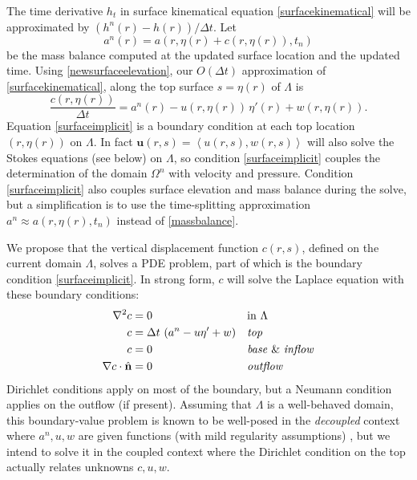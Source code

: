 \documentclass[letterpaper,final,12pt,reqno]{amsart}
\newcommand{\grad}{\nabla}
\newcommand{\hbn}{\hat{\mathbf{n}}}
\newcommand{\bu}{\mathbf{u}}
\begin{document}
The time derivative $h_t$ in surface kinematical equation \eqref{surfacekinematical} will be approximated by $(h^n(r) - h(r))/\Delta t$.  Let
\begin{equation}
a^n(r) = a\left(r,\eta(r) + c(r,\eta(r)),t_n\right) \label{massbalance}
\end{equation}
be the mass balance computed at the updated surface location and the updated time.  Using \eqref{newsurfaceelevation}, our $O(\Delta t)$ approximation of \eqref{surfacekinematical}, along the top surface $s=\eta(r)$ of $\Lambda$ is
\begin{equation}
\frac{c(r,\eta(r))}{\Delta t} = a^n(r) - u(r,\eta(r))\,\eta'(r) + w(r,\eta(r)). \label{surfaceimplicit}
\end{equation}
Equation \eqref{surfaceimplicit} is a boundary condition at each top location $(r,\eta(r))$ on $\Lambda$.  In fact $\bu(r,s)=\left<u(r,s),w(r,s)\right>$ will also solve the Stokes equations (see below) on $\Lambda$, so condition \eqref{surfaceimplicit} couples the determination of the domain $\Omega^n$ with velocity and pressure.  Condition \eqref{surfaceimplicit} also couples surface elevation and mass balance during the solve, but a simplification is to use the time-splitting approximation $a^n \approx a(r,\eta(r),t_n)$ instead of \eqref{massbalance}.

We propose that the vertical displacement function $c(r,s)$, defined on the current domain $\Lambda$, solves a PDE problem, part of which is the boundary condition \eqref{surfaceimplicit}.  In strong form, $c$ will solve the Laplace equation with these boundary conditions:
\begin{align}
        \grad^2 c &= 0 &&\text{in } \Lambda \label{claplace} \\
                c &= \Delta t\,\left(a^n - u \eta' + w\right) &&\emph{top} \notag \\
                c &= 0 &&\text{\emph{base} \& \emph{inflow}} \notag \\
\grad c\cdot \hbn &= 0 &&\emph{outflow} \notag
\end{align}
Dirichlet conditions apply on most of the boundary, but a Neumann condition applies on the outflow (if present).  Assuming that $\Lambda$ is a well-behaved domain, this boundary-value problem is known to be well-posed in the \emph{decoupled} context where $a^n,u,w$ are given functions (with mild regularity assumptions) \cite{Evans2010}, but we intend to solve it in the coupled context where the Dirichlet condition on the top actually relates unknowns $c,u,w$.
\end{document}
